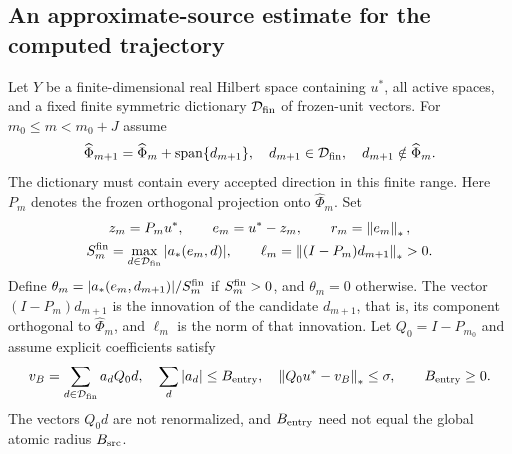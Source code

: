 \documentclass[11pt]{article}
\theoremstyle{remark}
\begin{document}
\subsection{An approximate-source estimate for the computed trajectory}
\label{sec:c5-source}

Let $Y$ be a finite-dimensional real Hilbert space containing $u^*$,
all active spaces, and a fixed finite symmetric dictionary
$\mathcal D_{\rm fin}$ of frozen-unit vectors. For $m_0\leq m<m_0+J$ assume
\begin{equation}
 \widehat\Phi_{m+1}=\widehat\Phi_m+\operatorname{span}\{d_{m+1}\},
 \quad d_{m+1}\in\mathcal D_{\rm fin},\quad d_{m+1}\notin\widehat\Phi_m .
 \label{eq:c5-spaces}
\end{equation}
The dictionary must contain every accepted direction in this finite range.
Here $P_m$ denotes the frozen orthogonal projection onto $\widehat\Phi_m$.
Set
\[
 \begin{gathered}
 z_m=P_mu^*,\qquad e_m=u^*-z_m,\qquad r_m=\left\lVert e_m\right\rVert_*,\\
 S_m^{\rm fin}=\max_{d\in\mathcal D_{\rm fin}}|a_*(e_m,d)|,\qquad
 \ell_m=\left\lVert(I-P_m)d_{m+1}\right\rVert_*>0 .
 \end{gathered}
\]
Define $\theta_m=|a_*(e_m,d_{m+1})|/S_m^{\rm fin}$ if
$S_m^{\rm fin}>0$, and $\theta_m=0$ otherwise.
The vector $(I-P_m)d_{m+1}$ is the innovation of the candidate
$d_{m+1}$, that is, its component orthogonal to $\widehat\Phi_m$, and
$\ell_m$ is the norm of that innovation.
Let $Q_0=I-P_{m_0}$ and assume explicit coefficients satisfy
\begin{equation}
 v_B=\sum_{d\in\mathcal D_{\rm fin}}a_dQ_0d,\quad
 \sum_d|a_d|\leq B_{\rm entry},\quad
 \left\lVert Q_0u^*-v_B\right\rVert_*\leq\sigma,\qquad B_{\rm entry}\geq0.
 \label{eq:c5-entry-source}
\end{equation}
The vectors $Q_0d$ are not renormalized, and $B_{\rm entry}$
need not equal the global atomic radius $B_{\rm src}$.
\end{document}
